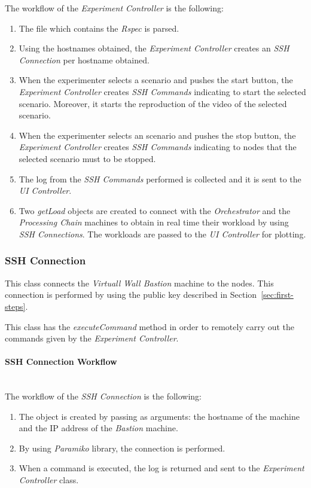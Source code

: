 The workflow of the \emph{Experiment Controller} is the following:
\begin{enumerate}
\item The file which contains the \emph{Rspec} is parsed.
\item Using the hostnames obtained, the \emph{Experiment Controller} creates an \emph{SSH Connection} per hostname obtained.
\item When the experimenter selects a scenario and pushes the start button, the \emph{Experiment Controller} creates \emph{SSH Commands} indicating to start the selected scenario. Moreover, it starts the reproduction of the video of the selected scenario.
\item When the experimenter selects an scenario and pushes the stop button, the \emph{Experiment Controller} creates \emph{SSH Commands} indicating to \vw nodes that the selected scenario must to be stopped.
\item The log from the \emph{SSH Commands} performed is collected and it is sent to the \emph{UI Controller}.
\item Two \emph{getLoad} objects are created to connect with the \emph{Orchestrator} and the \emph{Processing Chain} machines to obtain in real time their workload by using \emph{SSH Connections}. The workloads are passed to the \emph{UI Controller} for plotting.
\end{enumerate}

\subsubsection{SSH Connection}

This class connects the \emph{Virtuall Wall Bastion} machine to the \vw nodes. This connection is performed by using the public key described in Section~\ref{sec:first-steps}.

This class has the \emph{executeCommand} method in order to remotely carry out the commands given by the \emph{Experiment Controller}.

\paragraph{SSH Connection Workflow}~\\

The workflow of the \emph{SSH Connection} is the following:
\begin{enumerate}
\item The object is created by passing as arguments: the hostname of the \vw machine and the \ac{IP} address of the \vw \emph{Bastion} machine.
\item By using \emph{Paramiko} library, the connection is performed.
\item When a command is executed, the log is returned and sent to the \emph{Experiment Controller} class.
\end{enumerate}


